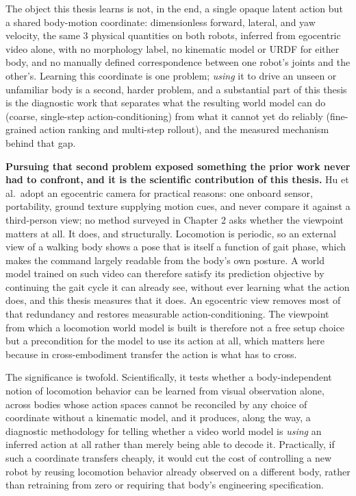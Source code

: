 \documentclass[12pt,a4paper,oneside]{report}
\begin{document}
\newpage
The object this thesis learns is not, in the end, a single opaque latent action but a
shared body-motion coordinate: dimensionless forward, lateral, and yaw velocity, the same 3 physical
quantities on both robots, inferred from egocentric video alone, with no morphology label, no kinematic model or
URDF for either body, and no manually defined correspondence between one robot's joints and the other's. Learning
this coordinate is one problem; \emph{using} it to drive an unseen or unfamiliar body is a second, harder problem,
and a substantial part of this thesis is the diagnostic work that separates what the resulting world model can
do (coarse, single-step action-conditioning) from what it cannot yet do reliably (fine-grained action ranking and
multi-step rollout), and the measured mechanism behind that gap.

\textbf{Pursuing that second problem exposed something the prior work never had to confront, and it is the
scientific contribution of this thesis.} Hu et al.\ adopt an egocentric camera for practical reasons: one
onboard sensor, portability, ground texture supplying motion cues, and never compare it against a third-person
view; no method surveyed in Chapter 2 asks whether the viewpoint matters at all. It does, and structurally.
Locomotion is periodic, so an external view of a walking body shows a pose that is itself a function of gait
phase, which makes the command largely readable from the body's own posture. A world model trained on such video
can therefore satisfy its prediction objective by continuing the gait cycle it can already see, without ever
learning what the action does, and this thesis measures that it does. An egocentric view removes
most of that redundancy and restores measurable action-conditioning. The viewpoint from which a locomotion world
model is built is therefore not a free setup choice but a precondition for the model to use its action at all,
which matters here because in cross-embodiment transfer the action is what has to cross.

The significance is twofold. Scientifically, it tests whether a body-independent notion of locomotion behavior
can be learned from visual observation alone, across bodies whose action spaces cannot be reconciled by any
choice of coordinate without a kinematic model, and it produces, along the way, a diagnostic methodology for
telling whether a video world model is \emph{using} an inferred action at all rather than merely being able to
decode it. Practically, if such a coordinate transfers cheaply, it would cut the cost of controlling a new robot
by reusing locomotion behavior already observed on a different body, rather than retraining from zero or
requiring that body's engineering specification.
\end{document}
